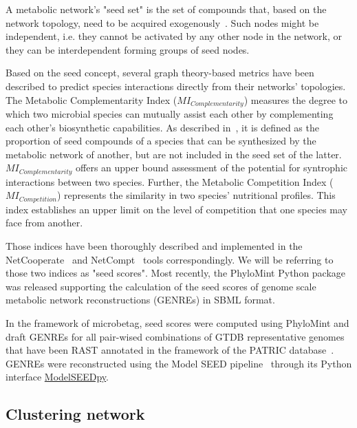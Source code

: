 \documentclass[sn-mathphys,Numbered]{sn-jnl}%
\theoremstyle{thmstyleone}%
\theoremstyle{thmstyletwo}%
\theoremstyle{thmstylethree}%
\begin{document}
        A metabolic network’s "seed set" is the set of compounds that, based on the network topology, need to be acquired exogenously~\cite{borenstein2008large}.
        Such nodes might be independent, i.e. they cannot be activated by any other node in the network, or they can be interdependent forming groups of seed nodes.

        
        Based on the seed concept, several graph theory-based metrics have been described to predict species interactions directly from their networks' topologies.
        The Metabolic Complementarity Index ($MI_{Complementarity}$) measures the degree to which two microbial species can mutually assist each other by complementing each other's biosynthetic capabilities.
        As described in~\cite{phylomint_ms}, it is defined as the proportion of seed compounds of a species that can be synthesized by the metabolic network of another, but are not included in the seed set of the latter. 
        $MI_{Complementarity}$ offers an upper bound assessment of the potential for syntrophic interactions between two species.        
        Further, the Metabolic Competition Index ($MI_{Competition}$) represents the similarity in two species’ nutritional profiles. 
        This index establishes an upper limit on the level of competition that one species may face from another.

        Those indices have been thoroughly described and implemented in the NetCooperate~\cite{levy2015netcooperate} and NetCompt~\cite{kreimer2012netcmpt} tools correspondingly.
        We will be referring to those two indices as "seed scores". 
        Most recently, the PhyloMint Python package~\cite{phylomint_ms} was released supporting the calculation of the seed scores of genome scale metabolic network reconstructions (GENREs) in SBML format.

        In the framework of microbetag, seed scores were computed using PhyloMint and draft GENREs for all pair-wised combinations of GTDB representative genomes that have been RAST annotated in the framework of the PATRIC database~\cite{wattam2017improvements}.
        GENREs were reconstructed using the Model SEED pipeline~\cite{henry2010high} through its Python interface \href{https://modelseedpy.readthedocs.io/en/latest/index.html}{ModelSEEDpy}.
        
        








    \subsection*{ Clustering network  }
        \label{subsec:mant}
\end{document}
